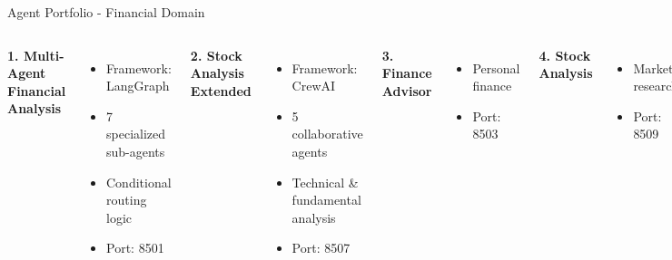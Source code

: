 \documentclass[aspectratio=169,11pt]{beamer}
\begin{document}
\begin{frame}{Agent Portfolio - Financial Domain}
\begin{columns}
\textbf{1. Multi-Agent Financial Analysis}
\begin{itemize}
    \item Framework: LangGraph
    \item 7 specialized sub-agents
    \item Conditional routing logic
    \item Port: 8501
\end{itemize}

\textbf{2. Stock Analysis Extended}
\begin{itemize}
    \item Framework: CrewAI
    \item 5 collaborative agents
    \item Technical \& fundamental analysis
    \item Port: 8507
\end{itemize}

\textbf{3. Finance Advisor}
\begin{itemize}
    \item Personal finance
    \item Port: 8503
\end{itemize}

\textbf{4. Stock Analysis}
\begin{itemize}
    \item Market research
    \item Port: 8509
\end{itemize}

\textbf{5. Competitive Intel}
\begin{itemize}
    \item Business analysis
    \item Port: 8504
\end{itemize}
\end{columns}
\end{frame}
\end{document}
